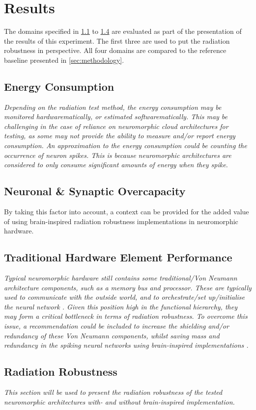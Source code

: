 \section{Results}\label{sec:results}
The domains specified in \cref{subsec:results_energy_consumption} to \cref{subsec:results_radiation_robustness} are evaluated as part of the presentation of the results of this experiment. The first three are used to put the radiation robustness in perspective. All four domains are compared to the reference baseline presented in \cref{sec:methodology}.

\subsection{Energy Consumption}\label{subsec:results_energy_consumption}
\textit{Depending on the radiation test method, the energy consumption may be monitored hardwarematically, or estimated softwarematically. This may be challenging in the case of reliance on neuromorphic cloud architectures for testing, as some may not provide the ability to measure and/or report energy consumption. An approximation to the energy consumption could be counting the occurrence of neuron spikes. This is because neuromorphic architectures are considered to only consume significant amounts of energy when they spike.}

\subsection{Neuronal \& Synaptic Overcapacity}\label{subsec:results_neuronal_synaptic_overcapacity}
By taking this factor into account, a context can be provided for the added value of using brain-inspired radiation robustness implementations in neuromorphic hardware.

\subsection{Traditional Hardware Element Performance}\label{subsec:results_traditional_hardware_element_performance}
\textit{Typical neuromorphic hardware still contains some traditional/Von Neumann architecture components, such as a memory bus and processor. These are typically used to communicate with the outside world, and to orchestrate/set up/initialise the neural network \cite{TODO}. Given this position high in the functional hierarchy, they may form a critical bottleneck in terms of radiation robustness. To overcome this issue, a recommendation could be included to increase the shielding and/or redundancy of these Von Neumann components, whilst saving mass and redundancy in the spiking neural networks using brain-inspired implementations \cite{johan_kwisthout_personal_corrospondence_feb_15}.}

\subsection{Radiation Robustness}\label{subsec:results_radiation_robustness}
\textit{This section will be used to present the radiation robustness of the tested neuromorphic architectures with- and without brain-inspired implementation.}